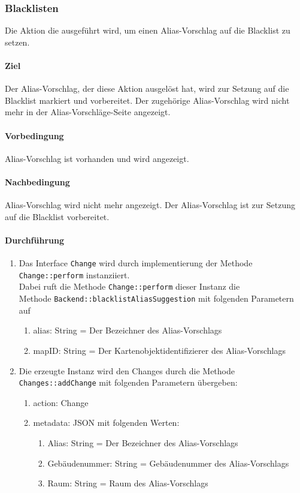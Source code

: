 \newpage
\subsubsection{\Large Blacklisten}

Die Aktion die ausgeführt wird, um einen Alias-Vorschlag auf die Blacklist zu setzen.

\paragraph*{Ziel}
Der Alias-Vorschlag, der diese Aktion ausgelöst hat, wird zur Setzung auf die Blacklist markiert und vorbereitet.
Der zugehörige Alias-Vorschlag wird nicht mehr in der Alias-Vorschläge-Seite angezeigt.

\paragraph*{Vorbedingung}
Alias-Vorschlag ist vorhanden und wird angezeigt.

\paragraph*{Nachbedingung}
Alias-Vorschlag wird nicht mehr angezeigt. Der Alias-Vorschlag ist zur Setzung auf die Blacklist vorbereitet.

\paragraph*{Durchführung}
\begin{enumerate}
    \item Das Interface \verb#Change# wird durch implementierung der Methode \verb#Change::perform# instanziiert. \\
          Dabei ruft die Methode \verb#Change::perform# dieser Instanz die \\ 
          Methode \verb#Backend::blacklistAliasSuggestion# mit folgenden Parametern auf \begin{enumerate}
              \item alias: String = Der Bezeichner des Alias-Vorschlags
              \item mapID: String = Der Kartenobjektidentifizierer des Alias-Vorschlags
          \end{enumerate}
    \item Die erzeugte Instanz wird den Changes durch die Methode \verb#Changes::addChange# mit folgenden Parametern übergeben: \begin{enumerate}
        \item action: Change
        \item metadata: JSON mit folgenden Werten: \begin{enumerate}
            \item Alias: String = Der Bezeichner des Alias-Vorschlags
            \item Gebäudenummer: String = Gebäudenummer des Alias-Vorschlags
            \item Raum: String = Raum des Alias-Vorschlags
        \end{enumerate}
    \end{enumerate}
\end{enumerate}